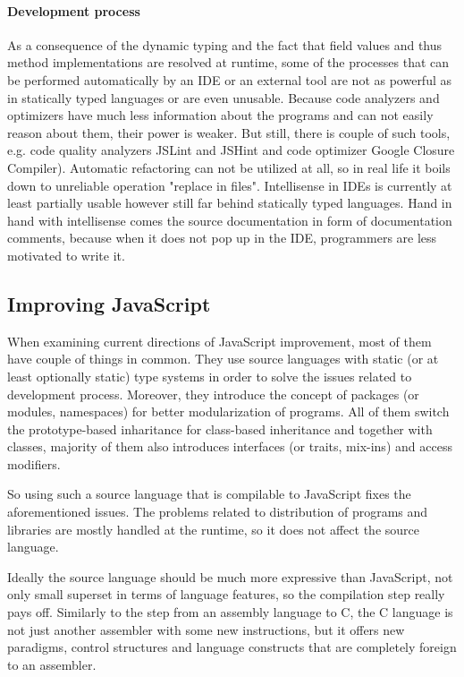 \documentclass[12pt,a4paper]{report}
\begin{document}
\paragraph{Development process} As a consequence of the dynamic typing and the fact that field values and thus method implementations are resolved at runtime, some of the processes that can be performed automatically by an IDE or an external tool are not as powerful as in statically typed languages or are even unusable. Because code analyzers and optimizers have much less information about the programs and can not easily reason about them, their power is weaker. But still, there is couple of such tools, e.g. code quality analyzers JSLint\cite{JsLint} and JSHint\cite{JsHint} and code optimizer Google Closure Compiler\cite{GoogleClosure}). Automatic refactoring can not be utilized at all, so in real life it boils down to unreliable operation "replace in files". Intellisense in IDEs is currently at least partially usable however still far behind statically typed languages. Hand in hand with intellisense comes the source documentation in form of documentation comments, because when it does not pop up in the IDE, programmers are less motivated to write it.

\subsection{Improving JavaScript}

When examining current directions of JavaScript improvement, most of them have couple of things in common. They use source languages with static (or at least optionally static) type systems in order to solve the issues related to development process. Moreover, they introduce the concept of packages (or modules, namespaces) for better modularization of programs. All of them switch the prototype-based inharitance for class-based inheritance and together with classes, majority of them also introduces interfaces (or traits, mix-ins) and access modifiers.

So using such a source language that is compilable to JavaScript fixes the aforementioned issues. The problems related to distribution of programs and libraries are mostly handled at the runtime, so it does not affect the source language.

Ideally the source language should be much more expressive than JavaScript, not only small superset in terms of language features, so the compilation step really pays off. Similarly to the step from an assembly language to C, the C language is not just another assembler with some new instructions, but it offers new paradigms, control structures and language constructs that are completely foreign to an assembler.
\end{document}
